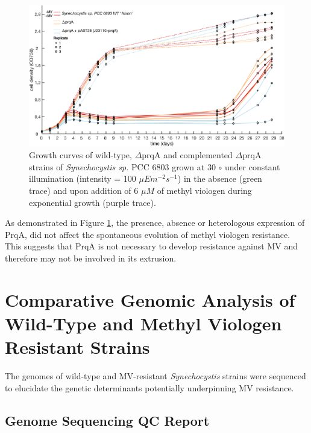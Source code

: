 \documentclass[12pt]{article}
\begin{document}
\begin{figure}[H]
    \centering
    \includegraphics[width=\hsize]{../Figures/MV_adaptation/syn_prqA_MVadapt.png}
    \caption{Growth curves of wild-type, $\Delta$prqA and complemented $\Delta$prqA strains of \textit{Synechocystis sp.} PCC 6803 grown at 30 $\circ$ under constant illumination (intensity = 100 $\mu Em^{-2}s^{-1}$) in the absence (green trace) and upon addition  of 6 $\mu M$ of methyl viologen during exponential growth (purple trace).}
    \label{fig:prqAMV}
\end{figure}

As demonstrated in Figure \ref{fig:prqAMV}, the presence, absence or heterologous expression of PrqA, did not affect the spontaneous evolution of methyl viologen resistance. This suggests that PrqA is not necessary to develop resistance against MV and therefore may not be involved in its extrusion. 


\section{Comparative Genomic Analysis of Wild-Type and Methyl Viologen Resistant Strains}

The genomes of wild-type and MV-resistant \textit{Synechocystis} strains were sequenced to elucidate the genetic determinants potentially underpinning MV resistance. 


\subsection{Genome Sequencing QC Report}
\end{document}
